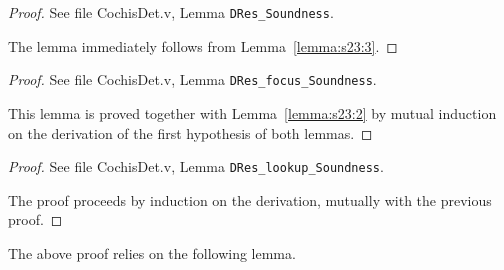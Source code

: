 {\centering
{}}
\begin{proof}
See file CochisDet.v, Lemma \texttt{DRes\_Soundness}.

The lemma immediately follows from Lemma~\ref{lemma:s23:3}.
\end{proof} 
{\centering
{}}
\begin{proof}
See file CochisDet.v, Lemma \texttt{DRes\_focus\_Soundness}.

This lemma is proved together with Lemma~\ref{lemma:s23:2} by mutual induction on the derivation of the first hypothesis of both lemmas.
\end{proof}
{\centering
{}}
\begin{proof}
See file CochisDet.v, Lemma \texttt{DRes\_lookup\_Soundness}.

The proof proceeds by induction on the derivation, mutually 
with the previous proof.
\end{proof}
The above proof relies on the following lemma.

